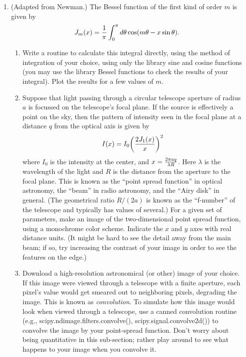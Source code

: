\documentclass[]{article}
\begin{document}
\begin{enumerate}
\item  (Adapted from Newman.) The Bessel function of the first kind of order $m$ is given by 
\begin{equation}
  J_m(x) = {1 \over \pi} \int_0^\pi d\theta \cos (m \theta - x \sin\theta).
\end{equation}
\begin{enumerate}[a] 
\item Write a routine to calculate this integral directly, using the method of integration of your choice, using only the library sine and cosine functions (you may use the library Bessel functions to check the results of your integral).  Plot the results for a few values of $m$.
\item
Suppose that light passing through a circular telescope aperture of radius $a$ is focussed on the telescope's focal plane.  If the source is effectively a point on the sky, then the pattern of intensity seen in the focal plane at a distance $q$ from the optical axis is given by 
\begin{equation}
I(x) = I_0{\left( 2  J_1(x) \over x\right)^2}
\end{equation}
where $I_0 $ is the intensity at the center, and $x = {2 \pi a q \over \lambda  R}$.  Here $\lambda$ is the wavelength of the light and $R$ is the distance from the aperture to the focal plane.  This is known as the ``point spread function'' in optical astronomy, the ``beam'' in radio astronomy, and the ``Airy disk'' in general.  (The geometrical ratio $R/(2a)$ is known as the ``f-number'' of the telescope and typically has values of several.)  For a given set of parameters, make an image of the two-dimensional point spread function, using a monochrome color scheme.  Indicate the $x$ and $y$ axes with real distance units.  (It might be hard to see the detail away from the main beam; if so, try increasing the contrast of your image in order to see the features on the edge.)  
\item Download a high-resolution astronomical (or other) image of your choice.  If this image were viewed through a telescope with a finite aperture, each pixel's value would get smeared out to neighboring pixels, degrading the image.  This is known as {\it convolution}.  To simulate how this image would look when viewed through a telescope, use a canned convolution routine (e.g., scipy.ndimage.filters.convolve(), scipy.signal.convolve2d())  to convolve the image by your point-spread function.  Don't worry about being quantitative in this sub-section; rather play around to see what happens to your image when you convolve it.
\end{enumerate}



\end{enumerate}
\end{document}
